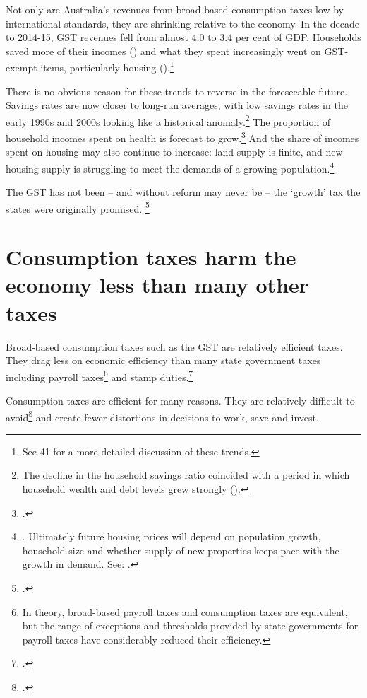 \documentclass{grattanAlpha}
\begin{document}
Not only are Australia’s revenues from broad-based consumption taxes low by international standards, they are shrinking relative to the economy. In the decade to 2014-15, GST revenues fell from almost 4.0 to 3.4 per cent of GDP.  Households saved more of their incomes () and what they spent increasingly went on GST-exempt items, particularly housing ().\footnote{See \textcites{Treasury2014-Budget-Papers-2014-15}[][38--41]{PBO2014TrendsAustralianGovtReceipts1982to2013} 41 for a more detailed discussion of these trends.} 

There is no obvious reason for these trends to reverse in the foreseeable future. Savings rates are now closer to long-run averages, with low savings rates in the early 1990s and 2000s looking like a historical anomaly.\footnote{The decline in the household savings ratio coincided with a period in which household wealth and debt levels grew strongly (\textcite[][38]{PBO2014TrendsAustralianGovtReceipts1982to2013}).}  The proportion of household incomes spent on health is forecast to grow.\footcite[][28]{DaleyWoodWeidmannEtAl2014}  And the share of incomes spent on housing may also continue to increase: land supply is finite, and new housing supply is struggling to meet the demands of a growing population.\footnote{\textcite{DaleyCoates2015PropertyTaxes}. Ultimately future housing prices will depend on population growth, household size and whether supply of new properties keeps pace with the growth in demand. See: \textcite[][7]{RBA2014SubmissionAffordableHousingInquiry}.}

The GST has not been – and without reform may never be – the ‘growth’ tax the states were originally promised. \footcite{CostelloBudgetSpeech2000-01}

\section{Consumption taxes harm the economy less than many other taxes}\label{sec:GST-1-2}
Broad-based consumption taxes such as the GST are relatively efficient taxes. They drag less on economic efficiency than many state government taxes including payroll taxes\footnote{In theory, broad-based payroll taxes and consumption taxes are equivalent, but the range of exceptions and thresholds provided by state governments for payroll taxes have considerably reduced their efficiency.}  and stamp duties.\footcite[][12]{DaleyCoates2015PropertyTaxes}  

Consumption taxes are efficient for many reasons. They are relatively difficult to avoid\footcite[][274]{HenryTaxReview2010}  and create fewer distortions in decisions to work, save and invest. 
\end{document}
